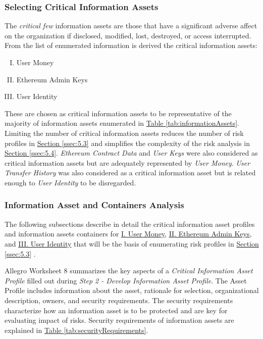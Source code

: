 \documentclass[a4paper,12pt]{article} %
\newcommand{\hypertableref}[1]{\hyperref[#1]{Table \ref{#1}}}
\newcommand{\hypersectionref}[1]{\hyperref[#1]{Section \ref{#1}}}
\begin{document}
{\subsubsection{Selecting Critical Information Assets} \label{sssec:5.2:criticalAssets}

The \textit{critical few} information assets are those that have a significant adverse affect on the organization if disclosed, modified, lost, destroyed, or access interrupted. From the list of enumerated information is derived the critical information assets:

\begin{enumerate}[(I)] \label{enum:criticalInformationAssets}
	\item User Money
	\item Ethereum Admin Keys
	\item User Identity
\end{enumerate}

These are chosen as critical information assets to be representative of the majority of information assets enumerated in \hypertableref{tab:informationAssets}. Limiting the number of critical information assets reduces the number of risk profiles in \hypersectionref{ssec:5.3} and simplifies the complexity of the risk analysis in \hypersectionref{ssec:5.4}. \textit{Ethereum Contract Data} and \textit{User Keys} were also considered as critical information assets but are adequately represented by \textit{User Money}. \textit{User Transfer History} was also considered as a critical information asset but is related enough to \textit{User Identity} to be disregarded.

\subsubsection{Information Asset and Containers Analysis} \label{sssec:5.2:analysis}

The following subsections describe in detail the critical information asset profiles and information assets containers for \hyperref[sssec:5.2:userMoney]{I. User Money}, \hyperref[sssec:5.2:ethereumAdminKeys]{II. Ethereum Admin Keys}, and \hyperref[sssec:5.2:userIdentity]{III. User Identity} that will be the basis of enumerating risk profiles in \hypersectionref{ssec:5.3} .

Allegro Worksheet 8 summarizes the key aspects of a \textit{Critical Information Asset Profile} filled out during \textit{Step 2 - Develop Information Asset Profile}. The Asset Profile includes information about the asset, rationale for selection, organizational description, owners, and security requirements. The security requirements characterize how an information asset is to be protected and are key for evaluating impact of risks. Security requirements of information assets are explained in \hypertableref{tab:securityRequirements}.

}
\end{document}
